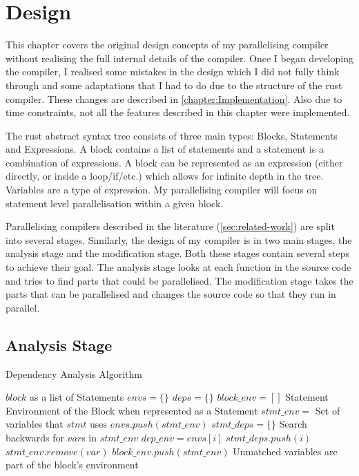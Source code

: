 \chapter{Design}
\label{chapter:Design}
This chapter covers the original design concepts of my parallelising compiler without realising the full internal details of the compiler. Once I began developing the compiler, I realised some mistakes in the design which I did not fully think through and some adaptations that I had to do due to the structure of the rust compiler. These changes are described in \autoref{chapter:Implementation}. Also due to time constraints, not all the features described in this chapter were implemented.

The rust abstract syntax tree consists of three main types: Blocks, Statements and Expressions. A block contains a list of statements and a statement is a combination of expressions. A block can be represented as an expression (either directly, or inside a loop/if/etc.) which allows for infinite depth in the tree. Variables are a type of expression. My parallelising compiler will focus on statement level parallelisation within a given block.

Parallelising compilers described in the literature (\autoref{sec:related-work}) are split into several stages. Similarly, the design of my compiler is in two main stages, the analysis stage and the modification stage. Both these stages contain several steps to achieve their goal. The analysis stage looks at each function in the source code and tries to find parts that could be parallelised. The modification stage takes the parts that can be parallelised and changes the source code so that they run in parallel.

\section{Analysis Stage}
\begin{algorithm}[H]
\caption{Dependency Analysis Algorithm}
\label{algorithm:dependency-analysis}
\begin{algorithmic}[1]
    \Require $block$ as a list of Statements
    \State $envs = \{\}$
    \State $deps = \{\}$
    \State $block\_env = []$ \Comment Statement Environment of the Block when represented as a Statement
        \State $stmt\_env =$ Set of variables that $stmt$ uses
        \State $envs.push(stmt\_env)$
        \State $stmt\_deps = \{\}$
         \Comment Search backwards for $var$s in $stmt\_env$
            \State $dep\_env = envs[i]$
                \State $stmt\_deps.push(i)$
                \State $stmt\_env.remove(var)$
            \EndFor
        \EndFor
        \State $block\_env.push(stmt\_env)$ \Comment Unmatched variables are part of the block's environment
    \EndFor
\end{algorithmic}
\end{algorithm}

